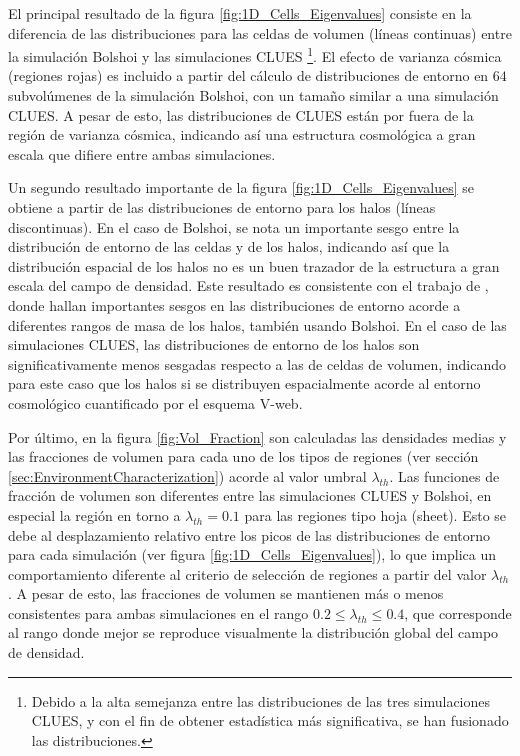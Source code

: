 El principal resultado de la figura \ref{fig:1D_Cells_Eigenvalues} consiste 
en la diferencia de las distribuciones para las celdas de volumen (líneas 
continuas) entre la simulación Bolshoi y las simu\-laciones CLUES
\footnote{Debido a la alta semejanza entre las distribuciones de las tres
simulaciones CLUES, y con el fin de obtener estadística más significativa,
se han fusionado las distribuciones.}. El efecto de varianza cósmica 
(regiones rojas) es incluido a partir del cálculo de distribuciones de 
entorno en $64$ subvolúmenes de la simulación Bolshoi, con un tamaño similar 
a una simulación CLUES. A pesar de esto, las distribuciones de CLUES están 
por fuera de la región de varianza cósmica, indicando así una estructura 
cosmológica a gran escala que difiere entre ambas simulaciones.


Un segundo resultado importante de la figura \ref{fig:1D_Cells_Eigenvalues}
se obtiene a partir de las distribuciones de entorno para los halos 
(líneas discontinuas). En el caso de Bolshoi, se nota un importante
sesgo entre la distribución de entorno de las celdas y de los halos, 
indicando así que la distribución espacial de los halos no es un buen 
trazador de la estructura a gran escala del campo de densidad. Este 
resultado es consistente con el trabajo de \cite{libeskind2013}, donde 
hallan importantes sesgos en las distribuciones de entorno acorde a 
diferentes rangos de masa de los halos, también usando Bolshoi. En el 
caso de las simulaciones CLUES, las distribuciones de entorno de los 
halos son significativamente menos sesgadas respecto a las de celdas de 
volumen, indicando para este caso que los halos si se distribuyen 
espacialmente acorde al entorno cosmológico cuantificado por el esquema 
V-web.


Por último, en la figura \ref{fig:Vol_Fraction} son calculadas las 
densidades medias y las fracciones de volumen para cada uno de los tipos 
de regiones (ver sección \ref{sec:EnvironmentCharacterization}) acorde al 
valor umbral $\lambda_{th}$. Las funciones de fracción de volumen son 
diferentes entre las simulaciones CLUES y Bolshoi, en especial la región 
en torno a $\lambda_{th} = 0.1$ para las regiones tipo hoja (sheet). Esto se 
debe al desplazamiento relativo entre los picos de las distribuciones de 
entorno para cada simulación (ver figura \ref{fig:1D_Cells_Eigenvalues}), 
lo que implica un comportamiento diferente al criterio de selección de 
regiones a partir del valor $\lambda_{th}$. A pesar de esto, las fracciones 
de volumen se mantienen más o menos consistentes para ambas simulaciones 
en el rango  $0.2 \leq \lambda_{th} \leq 0.4$, que corresponde al rango 
donde mejor se reproduce visualmente la distribución global del campo de 
densidad.

